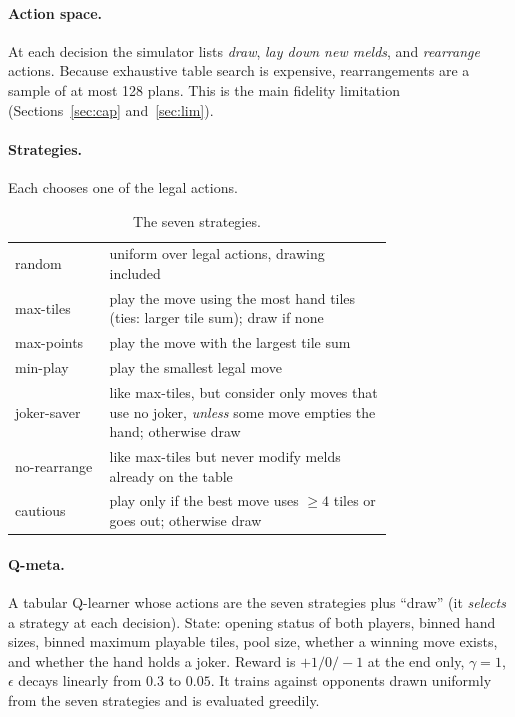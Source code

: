 \documentclass[11pt]{article}
\begin{document}
\paragraph{Action space.} At each decision the simulator lists \emph{draw}, \emph{lay down new melds}, and \emph{rearrange} actions. Because exhaustive table search is expensive, rearrangements are a sample of at most 128 plans. This is the main fidelity limitation (Sections~\ref{sec:cap} and~\ref{sec:lim}).

\paragraph{Strategies.} Each chooses one of the legal actions.
\begin{table}[h]\centering\small
\caption{The seven strategies.}\label{tab:strat}
\begin{tabular}{@{}lp{0.75\linewidth}@{}}\toprule
random & uniform over legal actions, drawing included\\
max-tiles & play the move using the most hand tiles (ties: larger tile sum); draw if none\\
max-points & play the move with the largest tile sum\\
min-play & play the smallest legal move\\
joker-saver & like max-tiles, but consider only moves that use no joker, \emph{unless} some move empties the hand; otherwise draw\\
no-rearrange & like max-tiles but never modify melds already on the table\\
cautious & play only if the best move uses $\ge4$ tiles or goes out; otherwise draw\\\bottomrule
\end{tabular}
\end{table}

\paragraph{Q-meta.} A tabular Q-learner \cite{watkins1992} whose actions are the seven strategies plus ``draw'' (it \emph{selects} a strategy at each decision). State: opening status of both players, binned hand sizes, binned maximum playable tiles, pool size, whether a winning move exists, and whether the hand holds a joker. Reward is $+1/0/-1$ at the end only, $\gamma=1$, $\epsilon$ decays linearly from $0.3$ to $0.05$. It trains against opponents drawn uniformly from the seven strategies and is evaluated greedily.
\end{document}
